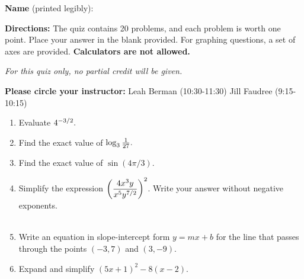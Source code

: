 \documentclass[12pt]{article}
\begin{document}
\textbf{Name} (printed legibly): \fbox{\strut\hspace{4in} }

\textbf{Directions:} The quiz contains 20 problems, and each problem is worth one point. Place your answer in the blank provided. For graphing questions, a set of axes are provided. {\bf Calculators are not allowed.}%

{\em For this quiz only, no partial credit will be given.}

\textbf{Please circle your instructor:} \hspace{.25in} Leah Berman (10:30-11:30)  \hspace{.25in}  Jill Faudree (9:15-10:15)
\begin{enumerate}
\item Evaluate ${\large{4^{-3/2}}}.$

\quad \hfill \underline{\hspace{2in}}
\vfill

\item Find the exact value of  ${\large{\log_{3}{\frac{1}{27}}}}.$

\quad \hfill \underline{\hspace{2in}}
\vfill

\item Find the exact value of $\sin ( 4 \pi /3).$

\quad \hfill \underline{\hspace{2in}}
\vfill

\item  Simplify the expression $\Large{\displaystyle{\left(\frac{4x^{3}y}{x^5y^{7/2}} \right)^2}}$. Write your answer without negative exponents.\\
\quad \\

\quad \hfill \underline{\hspace{2in}}
\vfill

\item Write an equation in slope-intercept form $y=mx+b$ for the line that passes through the points $(-3,7)$ and $(3,-9)$.\\

\quad \hfill \underline{\hspace{2in}}
\vfill
\newpage

\item Expand and simplify $(5x+1)^2-8(x-2).$\\


\end{enumerate}
\end{document}
